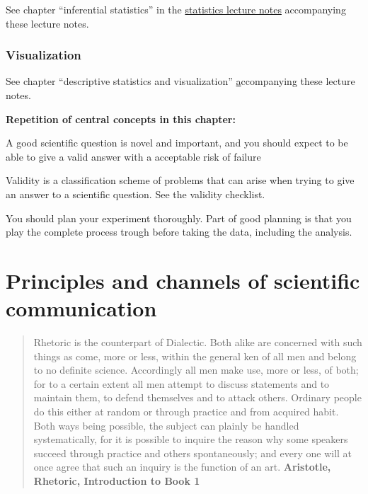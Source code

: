 \documentclass{tufte-book}
\begin{document}
See chapter ``inferential statistics'' in the \href{https://florianhartig.github.io/Statistics/}{statistics lecture notes} accompanying these lecture notes.


\subsection{Visualization}

See chapter ``descriptive statistics and visualization'' \href{https://florianhartig.github.io/Statistics/} accompanying these lecture notes.


\vspace{1cm}
\begin{mdframed}[backgroundcolor=black!10,rightline=false,leftline=false]
    
\textbf{Repetition of central concepts in this chapter:} 

\begin{itemize*}
  \item A good scientific question is novel and important, and you should expect to be able to give a valid answer with a acceptable risk of failure
  \item Validity is a classification scheme of problems that can arise when trying to give an answer to a scientific question. See the validity checklist.
  \item You should plan your experiment thoroughly. Part of good planning is that you play the complete process trough before taking the data, including the analysis.
\end{itemize*}

\end{mdframed}


\chapter{Principles and channels of scientific communication}

\begin{quotation}
Rhetoric is the counterpart of Dialectic. Both alike are concerned with such things as come, more or less, within the general ken of all men and belong to no definite science. Accordingly all men make use, more or less, of both; for to a certain extent all men attempt to discuss statements and to maintain them, to defend themselves and to attack others. Ordinary people do this either at random or through practice and from acquired habit. Both ways being possible, the subject can plainly be handled systematically, for it is possible to inquire the reason why some speakers succeed through practice and others spontaneously; and every one will at once agree that such an inquiry is the function of an art.\textbf{ Aristotle, Rhetoric, Introduction to Book 1}
\end{quotation}
\end{document}
